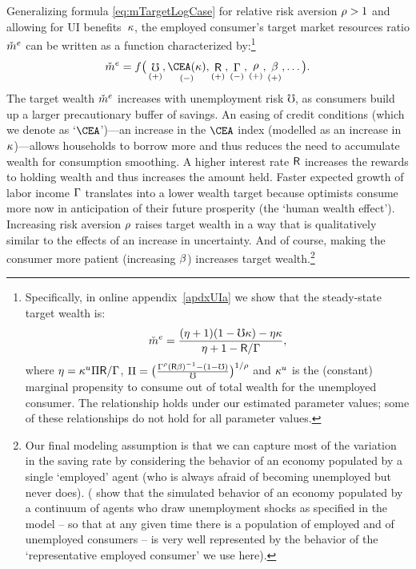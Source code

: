 \documentclass[titlepage]{\econtex}
\begin{document}
Generalizing  formula \eqref{eq:mTargetLogCase} for relative risk aversion $\rho > 1$ and allowing for UI benefits~$\kappa$, the employed consumer's target market resources ratio $\check{m}^{e}$ can be written as a function characterized by:\footnote{%
  Specifically, in online appendix~\ref{apdxUIa} we show that the steady-state target wealth is:
$$
\check{m}^{e}=\frac{(\eta+1)(1-\mho\kappa)-\eta\kappa}{\eta+1-\mathsf{R}/\Gamma},
$$
where $\eta=\kappa^u\Pi\mathsf{R}/\Gamma$, $\Pi=\big(\frac{\Gamma^{\rho}(\mathsf{R}\beta)^{-1}-(1-\mho)}{\mho}\big)^{1/\rho}$ and $\kappa^u$ is the (constant) marginal propensity to consume out of total wealth for the unemployed consumer. The relationship holds under our estimated parameter values; some of these relationships do not hold for all parameter values.
}
\begin{equation}
\mTarg^{e}=f\big(\mathop{\mho}_{(+)},\mathop{\CEA(\Severance)}_{(-)},\mathop{\Rfree}_{(+)},\mathop{\PGro}_{(-)},\mathop{\CRRA}_{(+)},\mathop{\DiscFac}_{(+)},\dots\big). \label{mTargetNonlin}
\end{equation}
The target wealth $\check{m}^{e}$ increases with unemployment risk $\mho$, as consumers build up a larger precautionary buffer of savings. %
An easing of credit conditions (which we denote as `$\CEA$')---an increase in the $\CEA$ index (modelled as an increase in $\kappa$)---allows households to borrow more and thus reduces the need to accumulate wealth for consumption smoothing. A higher interest rate $\mathsf{R}$ increases the rewards to holding wealth and thus increases the amount held. Faster expected growth of labor income $\Gamma$ translates into a lower wealth target because optimists consume more now in anticipation of their future prosperity (the `human wealth effect'). Increasing risk aversion $\rho$ raises target wealth in a way that is qualitatively similar to the effects of an increase in uncertainty.  And of course, making the consumer more patient (increasing $\beta$) increases target wealth.\footnote{Our final modeling assumption is that we can capture most of the variation in the saving rate by considering the behavior of an economy populated by a single `employed' agent (who is always afraid of becoming unemployed but never does).  (\cite{cjSOE} show that the simulated behavior of an economy populated by a continuum of agents who draw unemployment shocks as specified in the model -- so that at any given time there is a population of employed and of unemployed consumers -- is very well represented by the behavior of the `representative employed consumer' we use here).
}
\end{document}
